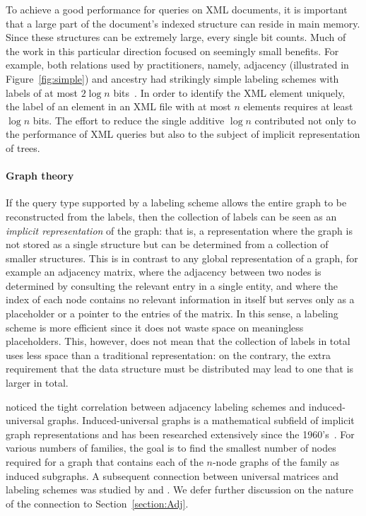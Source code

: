 To achieve a good performance for  queries on  XML documents, it is important  that a large  part of the document's indexed structure can reside in main memory. Since these structures can be extremely large, every single bit counts.
Much of the work in this particular direction focused on seemingly small benefits. For example, both relations used by practitioners, namely, adjacency (illustrated in Figure~\ref{fig:simple}) and ancestry  had strikingly simple  labeling schemes with labels of at most $2 \log n$ bits~\cite{Kannan92}.
In order to identify the XML element uniquely, the label of an element  in an XML file with at most $n$ elements requires at  least  $\log n$ bits. 
The effort to reduce the single additive $\log n$  contributed  not only to the performance of XML queries but also to the subject of implicit representation of trees.

\paragraph{Graph theory}
If the query type supported by a labeling scheme allows the entire graph to be reconstructed from the labels, then the collection of labels can be seen as an \emph{implicit representation} of the graph: that is, a representation where the graph is not stored as a single structure but can be determined from a collection of smaller structures.
This is in contrast to any global representation of a graph, for example an adjacency matrix, where the adjacency between two nodes is determined by consulting the relevant entry in a single entity, and where the index of each node contains no relevant information in itself but serves only as a placeholder or a pointer to the entries of the matrix. 
In this sense, a labeling scheme is more efficient since it does not waste space on meaningless placeholders. This, however, does not mean that the collection of labels in total uses less space than a traditional representation: on the contrary, the extra requirement that the data structure must be distributed may lead to one that is  larger in total. 

 noticed the tight correlation between adjacency labeling schemes and induced-universal graphs. Induced-universal graphs is  a mathematical subfield of implicit graph representations and has been researched extensively since the 1960's~\cite{rado1964universal}. 
For various numbers of families, the goal is to find the smallest number of nodes required for a graph that contains each of the $n$-node graphs of the family  as induced subgraphs. 
 A subsequent connection between universal matrices and \distance labeling schemes was studied by  and .
We defer further discussion on the nature of the connection to Section~\ref{section:Adj}.

